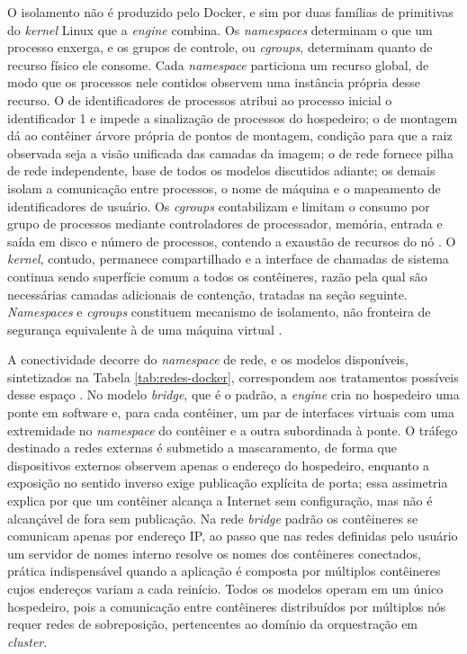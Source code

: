 O isolamento não é produzido pelo Docker, e sim por duas famílias de primitivas do \emph{kernel} Linux que a \emph{engine} combina. Os \emph{namespaces} determinam o que um processo enxerga, e os grupos de controle, ou \emph{cgroups}, determinam quanto de recurso físico ele consome. Cada \emph{namespace} particiona um recurso global, de modo que os processos nele contidos observem uma instância própria desse recurso. O de identificadores de processos atribui ao processo inicial o identificador 1 e impede a sinalização de processos do hospedeiro; o de montagem dá ao contêiner árvore própria de pontos de montagem, condição para que a raiz observada seja a visão unificada das camadas da imagem; o de rede fornece pilha de rede independente, base de todos os modelos discutidos adiante; os demais isolam a comunicação entre processos, o nome de máquina e o mapeamento de identificadores de usuário. Os \emph{cgroups} contabilizam e limitam o consumo por grupo de processos mediante controladores de processador, memória, entrada e saída em disco e número de processos, contendo a exaustão de recursos do nó \cite{souppaya2017nist}. O \emph{kernel}, contudo, permanece compartilhado e a interface de chamadas de sistema continua sendo superfície comum a todos os contêineres, razão pela qual são necessárias camadas adicionais de contenção, tratadas na seção seguinte. \emph{Namespaces} e \emph{cgroups} constituem mecanismo de isolamento, não fronteira de segurança equivalente à de uma máquina virtual \cite{souppaya2017nist}.

A conectividade decorre do \emph{namespace} de rede, e os modelos disponíveis, sintetizados na Tabela \ref{tab:redes-docker}, correspondem aos tratamentos possíveis desse espaço \cite{dockerdocs2026}. No modelo \emph{bridge}, que é o padrão, a \emph{engine} cria no hospedeiro uma ponte em software e, para cada contêiner, um par de interfaces virtuais com uma extremidade no \emph{namespace} do contêiner e a outra subordinada à ponte. O tráfego destinado a redes externas é submetido a mascaramento, de forma que dispositivos externos observem apenas o endereço do hospedeiro, enquanto a exposição no sentido inverso exige publicação explícita de porta; essa assimetria explica por que um contêiner alcança a Internet sem configuração, mas não é alcançável de fora sem publicação. Na rede \emph{bridge} padrão os contêineres se comunicam apenas por endereço IP, ao passo que nas redes definidas pelo usuário um servidor de nomes interno resolve os nomes dos contêineres conectados, prática indispensável quando a aplicação é composta por múltiplos contêineres cujos endereços variam a cada reinício. Todos os modelos operam em um único hospedeiro, pois a comunicação entre contêineres distribuídos por múltiplos nós requer redes de sobreposição, pertencentes ao domínio da orquestração em \emph{cluster}.

